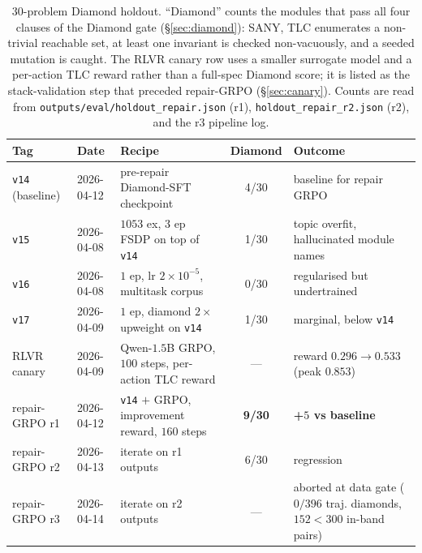 \documentclass[11pt]{article}
\begin{document}
\begin{table}[t]
\centering
\small
\begin{tabular}{l l l c l}
\toprule
Tag & Date & Recipe & Diamond & Outcome \\
\midrule
\texttt{v14} (baseline) & 2026-04-12 & pre-repair Diamond-SFT checkpoint               & 4/30 & baseline for repair GRPO \\
\texttt{v15}   & 2026-04-08 & $1053$ ex, $3$ ep FSDP on top of \texttt{v14}            & 1/30 & topic overfit, hallucinated module names \\
\texttt{v16}   & 2026-04-08 & $1$ ep, lr $2{\times}10^{-5}$, multitask corpus          & 0/30 & regularised but undertrained \\
\texttt{v17}   & 2026-04-09 & $1$ ep, diamond $2{\times}$ upweight on \texttt{v14}     & 1/30 & marginal, below \texttt{v14} \\
\midrule
RLVR canary    & 2026-04-09 & Qwen-$1.5$B GRPO, $100$ steps, per-action TLC reward    & ---  & reward $0.296{\to}0.533$ (peak $0.853$) \\
repair-GRPO r1 & 2026-04-12 & \texttt{v14} $+$ GRPO, improvement reward, $160$ steps  & \textbf{9/30} & \textbf{+$5$ vs baseline} \\
repair-GRPO r2 & 2026-04-13 & iterate on r1 outputs                                   & 6/30 & regression \\
repair-GRPO r3 & 2026-04-14 & iterate on r2 outputs                                   & ---  & aborted at data gate ($0/396$ traj. diamonds, $152<300$ in-band pairs) \\
\bottomrule
\end{tabular}
\caption{$30$-problem Diamond holdout. ``Diamond'' counts the modules
that pass all four clauses of the Diamond gate
(\S\ref{sec:diamond}): SANY, TLC enumerates a non-trivial reachable
set, at least one invariant is checked non-vacuously, and a seeded
mutation is caught. The RLVR canary row uses a smaller surrogate model
and a per-action TLC reward rather than a full-spec Diamond score;
it is listed as the stack-validation step that preceded repair-GRPO
(\S\ref{sec:canary}). Counts are read from
\texttt{outputs/eval/holdout\_repair.json} (r1),
\texttt{holdout\_repair\_r2.json} (r2), and the r3 pipeline log.}
\label{tab:diamond-history}
\end{table}
\end{document}
